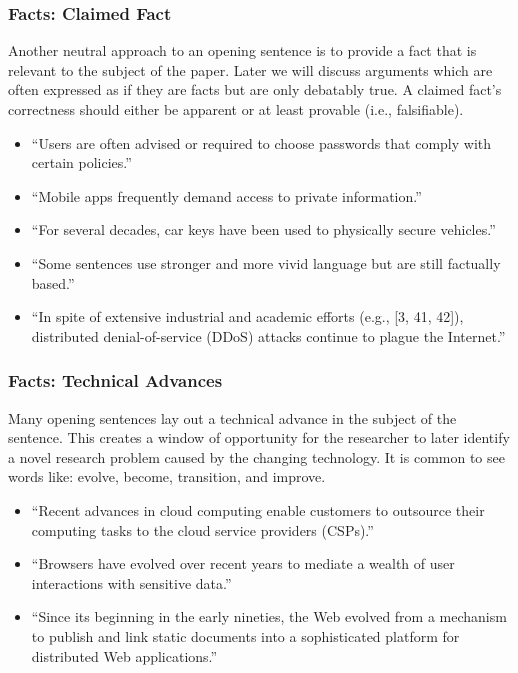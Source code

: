 \documentclass[sigconf,anonymous]{acmart}
\begin{document}
	\subsubsection{Facts: Claimed Fact}
	
	Another neutral approach to an opening sentence is to provide a fact that is relevant to the subject of the paper. Later we will discuss arguments which are often expressed as if they are facts but are only debatably true. A claimed fact’s correctness should either be apparent or at least provable (i.e., falsifiable). 
	\begin{itemize}	
		\item	``Users are often advised or required to choose passwords that comply with certain policies.''
		
		\item	``Mobile apps frequently demand access to private information.''
		
		\item	``For several decades, car keys have been used to physically secure vehicles.''
		
		\item	``Some sentences use stronger and more vivid language but are still factually based.'' 
		
		\item	``In spite of extensive industrial and academic efforts (e.g., [3, 41, 42]), distributed denial-of-service (DDoS) attacks continue to plague the Internet.''
	\end{itemize} 		
	\subsubsection{Facts: Technical Advances}
	
	Many opening sentences lay out a technical advance in the subject of the sentence. This creates a window of opportunity for the researcher to later identify a novel research problem caused by the changing technology.  It is common to see words like: evolve, become, transition, and improve.
	\begin{itemize}		
		\item	``Recent advances in cloud computing enable customers to outsource their computing tasks to the cloud service providers (CSPs).''
		
		\item	``Browsers have evolved over recent years to mediate a wealth of user interactions with sensitive data.''
		
		\item	``Since its beginning in the early nineties, the Web evolved from a mechanism to publish and link static documents into a sophisticated platform for distributed Web applications.''
	\end{itemize} 		
\end{document}
